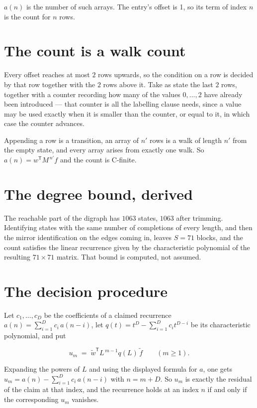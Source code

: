 \documentclass[11pt]{article}
\theoremstyle{definition}
\begin{document}
$a(n)$ is the number of such arrays. The entry's offset is 1, so its term of index $n$ is the count for $n$ rows.

\section{The count is a walk count}

Every offset reaches at most $2$ rows upwards, so the condition on a row is decided by that row together with the $2$ rows above it. Take as state the last $2$ rows, together with a counter recording how many of the values $0,\dots,2$ have already been introduced --- that counter is all the labelling clause needs, since a value may be used exactly when it is smaller than the counter, or equal to it, in which case the counter advances.

Appending a row is a transition, an array of $n'$ rows is a walk of length $n'$ from the empty state, and every array arises from exactly one walk. So $a(n) = w^{\mathsf T}M^{\,n'}f$ and the count is C-finite.

\section{The degree bound, derived}

The reachable part of the digraph has $1063$ states, $1063$ after trimming. Identifying states with the same number of completions of every length, and then the mirror identification on the edges coming in, leaves $S = 71$ blocks, and the count satisfies the linear recurrence given by the characteristic polynomial of the resulting $71\times71$ matrix. That bound is computed, not assumed.

\section{The decision procedure}

Let $c_1,\dots,c_D$ be the coefficients of a claimed recurrence $a(n) = \sum_{i=1}^{D} c_i\,a(n-i)$, let $q(t) = t^{D} - \sum_{i=1}^{D} c_i t^{D-i}$ be its characteristic polynomial, and put

\[u_m \;=\; \tilde w^{\mathsf T} L^{\,m-1} q(L)\,\tilde f \qquad (m \ge 1).\]

Expanding the powers of $L$ and using the displayed formula for $a$, one gets $u_m = a(n) - \sum_{i=1}^{D} c_i\,a(n-i)$ with $n = m + D$. So $u_m$ is exactly the residual of the claim at that index, and the recurrence holds at an index $n$ if and only if the corresponding $u_m$ vanishes.
\end{document}
